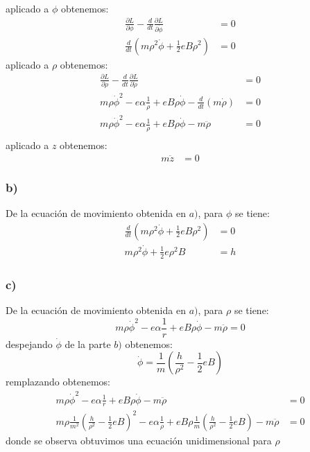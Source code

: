 \documentclass{article}
\begin{document}
\begin{tcolorbox}[breakable]
\begin{align*}
    \end{align*}
    aplicado a $\phi$ obtenemos:
    \begin{align*}
        \frac{\partial L}{\partial \phi} - \frac{d}{dt}\frac{\partial L}{\partial \dot{\phi}} &= 0 \\
        \frac{d}{dt}(m\rho^2\dot{\phi} + \frac{1}{2}eB\rho^2) &= 0
     \end{align*}
     aplicado a $\rho$ obtenemos:
    \begin{align*}
        \frac{\partial L}{\partial \rho} - \frac{d}{dt}\frac{\partial L}{\partial \dot{\rho}} &= 0 \\
        m\rho \dot{\phi}^2 - e\alpha \frac{1}{\rho} + eB\rho \dot{\phi} - \frac{d}{dt}(m\dot{\rho}) &= 0 \\
        m\rho \dot{\phi}^2 - e\alpha \frac{1}{\rho} + eB\rho \dot{\phi} - m\ddot{\rho} &= 0 \\ 
    \end{align*}
    aplicado a $z$ obtenemos:
    \begin{align*}
        m\ddot{z} &= 0
    \end{align*}
    \subsubsection*{b)}
    De la ecuación de movimiento obtenida en $a)$, para $\phi$ se tiene:
    \begin{align*}
        \frac{d}{dt}(m\rho^2\dot{\phi} + \frac{1}{2}eB\rho^2) &= 0 \\
        m\rho^2\dot{\phi} + \frac{1}{2}e\rho^2B &= h
    \end{align*}
    \subsubsection*{c)}
    De la ecuación de movimiento obtenida en $a)$, para $\rho$ se tiene:
    \[m\rho \dot{\phi}^2 - e\alpha \frac{1}{r} + eB\rho \dot{\phi} - m\ddot{\rho} = 0 \]
    despejando $\dot{\phi}$ de la parte $b)$ obtenemos:
    \[ \dot{\phi} = \frac{1}{m}\left( \frac{h}{\rho^2} - \frac{1}{2}eB \right) \]
    remplazando obtenemos:
    \begin{align*}
        m\rho \dot{\phi}^2 - e\alpha \frac{1}{r} + eB\rho \dot{\phi} - m\ddot{\rho} &= 0 \\
        m\rho \frac{1}{m^2}\left( \frac{h}{\rho^2} - \frac{1}{2}eB \right)^2 
        - e\alpha \frac{1}{\rho} 
        + eB\rho\frac{1}{m}\left( \frac{h}{\rho^2} - \frac{1}{2}eB \right) - m\ddot{\rho} &= 0
    \end{align*}
    donde se observa obtuvimos una ecuación unidimensional para $\rho$

\end{tcolorbox}
\end{document}
